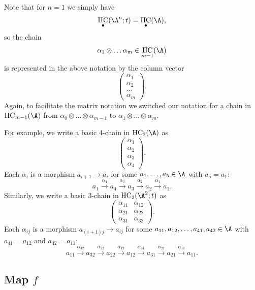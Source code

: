 \documentclass[12pt,a4paper,reqno]{amsart}
\DeclareMathOperator{\hochcx}{{HC}}
\begin{document}
Note that for $n = 1$ we simply have 
$$\hochcx_{\bullet}(\A^n;t) = \hochcx_{\bullet}(\A),$$
so the chain
$$ \alpha_1 \otimes \dots \alpha_{m} \in \hochcx_{m-1}(\A) $$
is represented in the above notation by the column vector
\begin{equation}
\begin{pmatrix}
\alpha_{1} \\
\alpha_{2} \\
\dots
\\
\alpha_{m} 
\end{pmatrix}.
\end{equation}
Again, to facilitate the matrix notation we switched our notation 
for a chain in   $\hochcx_{m-1}(\A)$ from 
$\alpha_0 \otimes \dots \otimes \alpha_{m-1}$ to $\alpha_1 \otimes \dots \otimes \alpha_{m}$. 


For example, we write a basic $4$-chain in $\hochcx_3(\A)$ as 
\begin{equation*}
\left(\begin{matrix}
\alpha_1 
\\
\alpha_2 
\\
\alpha_3 
\\
\alpha_4 
\end{matrix}
\right).
\end{equation*}
Each $\alpha_i$ is a morphism $a_{i+1} \rightarrow a_{i}$ for some
$a_1, \dots, a_5 \in \A$ with $a_5 = a_1$:
\begin{equation*}
a_1 \xrightarrow{\alpha_4} a_4 
\xrightarrow{\alpha_3} a_3 \xrightarrow{\alpha_2} a_2
\xrightarrow{\alpha_1} a_1.
\end{equation*}
Similarly, we write a basic $3$-chain in $\hochcx_{2}(\A^2;t)$ as 
\begin{equation*}
\left(\begin{matrix}
\alpha_{11} 
&
\alpha_{12} 
\\
\alpha_{21} 
&
\alpha_{22} 
\\
\alpha_{31} 
&
\alpha_{32}
\end{matrix}
\right).
\end{equation*}
Each $\alpha_{ij}$ is a morphism $a_{(i+1)j} \rightarrow a_{ij}$ for
some $a_{11}, a_{12}, \dots, a_{41}, a_{42} \in \A$ with $a_{41} =
a_{12}$ and $a_{42} = a_{11}$:
$$
a_{11} 
\xrightarrow{\alpha_{32}} a_{32}
\xrightarrow{\alpha_{22}} a_{22}
\xrightarrow{\alpha_{12}} a_{12}
\xrightarrow{\alpha_{31}} a_{31}
\xrightarrow{\alpha_{21}} a_{21}
\xrightarrow{\alpha_{11}} a_{11}.
$$

\subsection{Map $f$}
\label{section-map-f}
\end{document}
